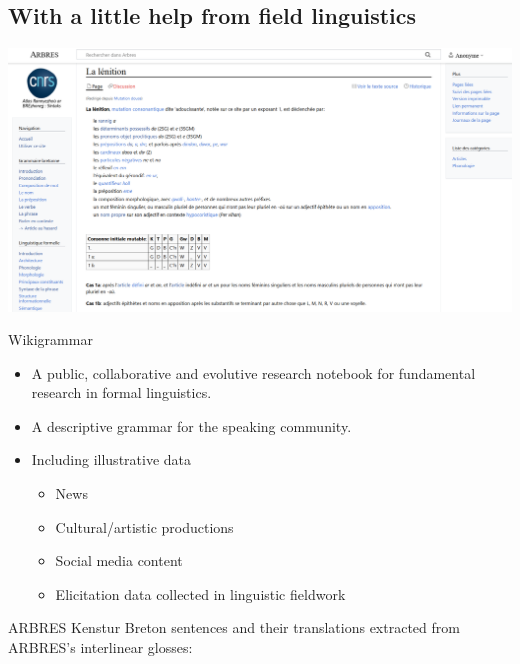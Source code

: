 \documentclass[
	xcolor={svgnames},
	aspectratio=169,
	french,
]{beamer}
\begin{document}
\subsection{With a little help from field linguistics}

\begin{frame}[plain]
	\includegraphics[width=1.1\textwidth]{pics/arbres.png}
\end{frame}

\begin{frame}{Wikigrammar}
	 \parencite{jouitteau2009ARBRESWikigrammaireDialectes}
	\begin{itemize}
		\item A public, collaborative and evolutive \alert{research notebook} for fundamental research in formal linguistics.
		\item A descriptive \alert{grammar for the speaking community}.
		\item Including \alert{illustrative data}
			\begin{itemize}
				\item News
				\item Cultural/artistic productions
				\item Social media content
				\item \alert{Elicitation} data collected in linguistic \alert{fieldwork}
			\end{itemize}
	\end{itemize}
\end{frame}

\begin{frame}{ARBRES Kenstur}
	\onslide<+->
	Breton sentences and their translations extracted from ARBRES's interlinear glosses:

	\begin{covexample}
	\end{covexample}
\end{frame}
\end{document}
